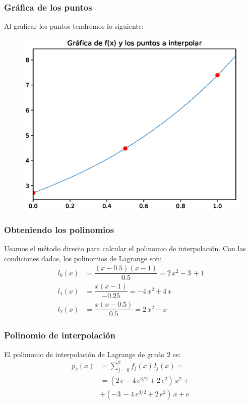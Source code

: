 \begin{frame}
\frametitle{Gráfica de los puntos}
Al graficar los puntos tendremos lo siguiente:
\begin{figure}
   \centering  
   \includegraphics[scale=0.52]{Imagenes/Ejemplo_interpolacion_Chebychev_01.eps}
\end{figure}
\end{frame}
\begin{frame}
\frametitle{Obteniendo los polinomios}
Usamos el método directo para calcular el polinomio de interpolación. Con las condiciones dadas, los polinomios de Lagrange son:
\begin{align*}
l_{0} (x) &= \dfrac{(x - 0.5)(x - 1)}{0.5} = 2 \, x^{2} - 3 \, + 1 \\[0.5em]
l_{1} (x) &= \dfrac{x (x - 1)}{-0.25} = - 4 \, x^{2} + 4 \, x \\[0.5em]
l_{2} (x) &= \dfrac{x (x - 0.5)}{0.5} = 2 \, x^{2} - x
\end{align*}
\end{frame}
\begin{frame}
\frametitle{Polinomio de interpolación}
El polimonio de interpolación de Lagrange de grado $2$ es:
\begin{align*}
p_{2}(x) &= \sum_{j=0}^{2} f_{j}(x) \, l_{j}(x) = \\[0.5em]
&= (2 \, e - 4 \, e^{3/2} + 2 \, e^{2}) \, x^{2} + \\[0.5em]
&+ (-3 \, - 4 \, e^{3/2} + 2 \, e^{2}) \, x + e
\end{align*}
\end{frame}

